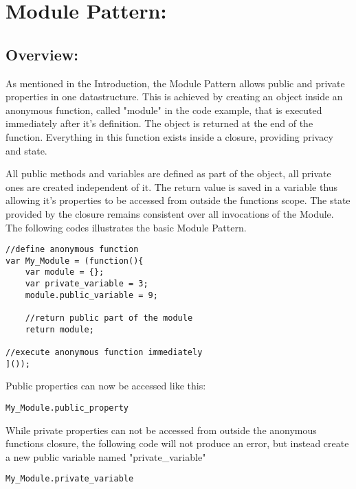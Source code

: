 \documentclass{bioinfo}
\begin{document}
\section{Module Pattern:}


\subsection{Overview:}
As mentioned in the Introduction, the Module Pattern allows public and private properties in one datastructure. This is achieved by creating an object inside an anonymous function, called "module" in the code example, that is executed immediately after it's definition. The object is returned at the end of the function. Everything in this function exists inside a closure, providing privacy and state.  \\

\begin{flushleft}
All public methods and variables are defined as part of the object, all private ones are created independent of it. The return value is saved in a variable thus allowing it's properties to be accessed from outside the functions scope. The state provided by the closure remains consistent over all invocations of the Module. The following codes illustrates the basic Module Pattern.
\end{flushleft}

\vspace{\baselineskip}
\vspace{\baselineskip}
\vspace{\baselineskip}

\begin{lstlisting}
//define anonymous function
var My_Module = (function(){
	var module = {};
	var private_variable = 3;
	module.public_variable = 9;

	//return public part of the module
	return module;

//execute anonymous function immediately
]());
\end{lstlisting}

Public properties can now be accessed like this:

\begin{lstlisting}
My_Module.public_property
\end{lstlisting}


While private properties can not be accessed from outside the anonymous functions closure, the following code will not produce an error, but instead create a new public variable named "private\_variable"
\begin{lstlisting}
My_Module.private_variable
\end{lstlisting}
\end{document}
